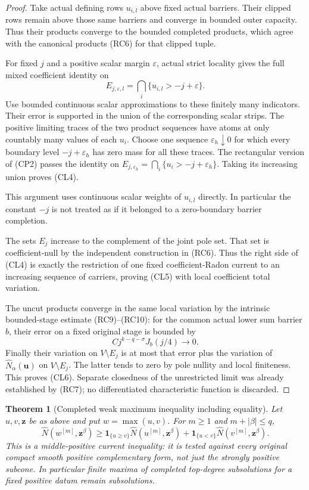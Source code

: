 \documentclass[11pt,a4paper]{article}
\numberwithin{equation}{section}
\newtheorem{theorem}{Theorem}[section]
\theoremstyle{definition}
\theoremstyle{remark}
\begin{document}
\begin{proof}
Take actual defining rows $u_{i,l}$ above fixed actual barriers.
Their clipped rows remain above those same barriers and converge
in bounded outer capacity. Thus their products converge to the
bounded completed products, which agree with the canonical
products (RC6) for that clipped tuple.

For fixed $j$ and a positive scalar margin $\varepsilon$, actual
strict locality gives the full mixed coefficient identity on
\[
                      E_{j,\varepsilon,l}
                      =\bigcap_i\{u_{i,l}>-j+\varepsilon\}.
\]
Use bounded continuous scalar approximations to these finitely
many indicators. Their error is supported in the union of the
corresponding scalar strips. The positive limiting traces of
the two product sequences have atoms at only countably many
values of each $u_i$. Choose one sequence
$\varepsilon_h\downarrow0$ for which every boundary level
$-j+\varepsilon_h$ has zero mass for all these traces.
The rectangular version of (CP2) passes the identity on
$E_{j,\varepsilon_h}=\bigcap_i\{u_i>-j+\varepsilon_h\}$.
Taking its increasing union proves (CL4).

This argument uses continuous scalar weights of $u_{i,l}$
directly. In particular the constant $-j$ is not treated as
if it belonged to a zero-boundary barrier completion.

The sets $E_j$ increase to the complement of the joint pole
set. That set is coefficient-null by the independent construction
in (RC6). Thus the right side of (CL4) is exactly the restriction
of one fixed coefficient-Radon current to an increasing sequence
of carriers, proving (CL5) with local coefficient total variation.

The uncut products converge in the same local variation by the
intrinsic bounded-stage estimate (RC9)--(RC10): for the common
actual lower sum barrier $b$, their error on a fixed original
stage is bounded by
\[
                  C j^{k-q-\sigma}J_b(j/4)\longrightarrow0.
 \tag{CL7}
\]
Finally their variation on $V\setminus E_j$ is at most that
error plus the variation of $\widehat N_\alpha(\mathbf u)$ on
$V\setminus E_j$. The latter tends to zero by pole nullity
and local finiteness. This proves (CL6). Separate closedness
of the unrestricted limit was already established by (RC7);
no differentiated characteristic function is discarded.
\end{proof}

\begin{theorem}[Completed weak maximum inequality including equality]
\label{thm:r11-completed-weak-maximum}
Let $u,v,\mathbf z$ be as above and put $w=\max(u,v)$.
For $m\geq1$ and $m+|\beta|\leq q$,
\[
 \widehat N(w^{[m]},\mathbf z^\beta)
   \geq\mathbf1_{\{u\geq v\}}
                   \widehat N(u^{[m]},\mathbf z^\beta)
       +\mathbf1_{\{u<v\}}
                   \widehat N(v^{[m]},\mathbf z^\beta).
 \tag{CL8}
\]
This is a middle-positive current inequality: it is tested
against every original compact smooth \emph{positive}
complementary form, not just the strongly positive subcone.
In particular finite maxima of completed top-degree
subsolutions for a fixed positive datum remain subsolutions.
\end{theorem}
\end{document}
